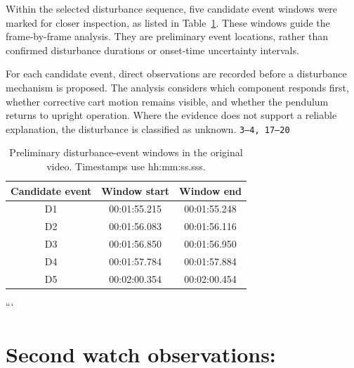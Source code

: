 \documentclass{article}
\newcommand{\manual}[1]{\texttt{#1}}
\begin{document}
Within the selected disturbance sequence, five candidate
event windows were marked for closer inspection, as listed
in Table~\ref{tab:disturbance-windows}.
These windows guide the frame-by-frame analysis.
They are preliminary event locations, rather than confirmed
disturbance durations or onset-time uncertainty intervals.

For each candidate event, direct observations are recorded
before a disturbance mechanism is proposed. The analysis
considers which component responds first, whether corrective
cart motion remains visible, and whether the pendulum returns
to upright operation. Where the evidence does not support a
reliable explanation, the disturbance is classified as unknown.
\manual{3--4, 17--20}

\begin{table}[htbp]
    \centering
    \small
    \caption{Preliminary disturbance-event windows in the
    original video. Timestamps use hh:mm:ss.sss.}
    \label{tab:disturbance-windows}
    \begin{tabular}{@{}ccc@{}}
        \toprule
        Candidate event & Window start & Window end \\
        \midrule
        D1 & 00:01:55.215 & 00:01:55.248 \\
        D2 & 00:01:56.083 & 00:01:56.116 \\
        D3 & 00:01:56.850 & 00:01:56.950 \\
        D4 & 00:01:57.784 & 00:01:57.884 \\
        D5 & 00:02:00.354 & 00:02:00.454 \\
        \bottomrule
    \end{tabular}
\end{table}
```


\section{Second watch observations:}
\end{document}
